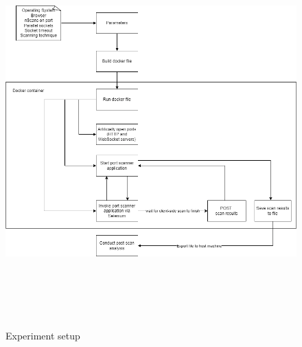 \begin{figure}[tbh]
    \centering
\includegraphics[width=15cm, height=15cm, keepaspectratio]{port_scanning_techniques/img/portscan_experiment.png}
    \caption{Experiment setup}
    \label{fig:experiment}
\end{figure}





